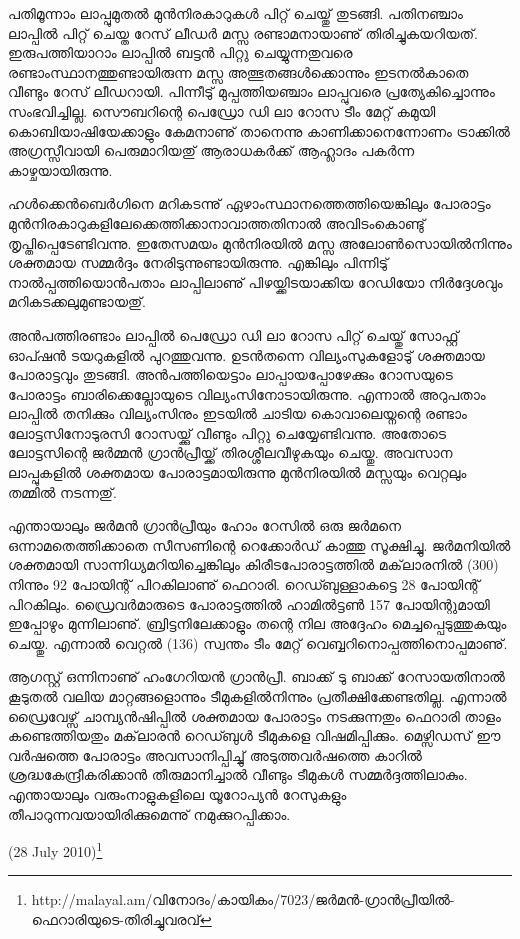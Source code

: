 പതിമൂന്നാം ലാപ്പുമുതല്‍ മുന്‍നിരകാറുകള്‍ പിറ്റ് ചെയ്തു് തുടങ്ങി. പതിനഞ്ചാം ലാപ്പില്‍ പിറ്റ് ചെയ്ത റേസ് ലീഡര്‍ മസ്സ 
രണ്ടാമനായാണു് തിരിച്ചുകയറിയത്. ഇരുപത്തിയാറാം ലാപ്പില്‍ ബട്ടന്‍ പിറ്റു ചെയ്യുന്നതുവരെ രണ്ടാംസ്ഥാനത്തുണ്ടായിരുന്ന 
മസ്സ അത്ഭുതങ്ങള്‍ക്കൊന്നും ഇടനല്‍കാതെ വീണ്ടും റേസ് ലീഡറായി. പിന്നീടു് മുപ്പത്തിയഞ്ചാം 
ലാപ്പുവരെ പ്രത്യേകിച്ചൊന്നും സംഭവിച്ചില്ല. സൌബറിന്റെ പെഡ്രോ ഡി ലാ റോസ ടീം മേറ്റ് കമുയി 
കൊബിയാഷിയേക്കാളും കേമനാണു് താനെന്നു കാണിക്കാനെന്നോണം ട്രാക്കില്‍ അഗ്രസ്സീവായി പെരുമാറിയതു് 
ആരാധകര്‍ക്ക് ആഹ്ലാദം പകര്‍ന്ന കാഴ്ചയായിരുന്നു.

ഹള്‍ക്കെന്‍ബെര്‍ഗിനെ മറികടന്നു് ഏഴാംസ്ഥാനത്തെത്തിയെങ്കിലും പോരാട്ടം 
മുന്‍നിരകാറുകളിലേക്കെത്തിക്കാനാവാത്തതിനാല്‍ അവിടംകൊണ്ടു് തൃപ്തിപ്പെടേണ്ടിവന്നു. ഇതേസമയം മുന്‍നിരയില്‍ 
മസ്സ അലോണ്‍സൊയില്‍നിന്നും ശക്തമായ സമ്മര്‍ദ്ദം നേരിടുന്നുണ്ടായിരുന്നു. എങ്കിലും പിന്നിടു് നാല്‍പ്പത്തിയൊന്‍പതാം 
ലാപ്പിലാണു് പിഴയ്ക്കിടയാക്കിയ റേഡിയോ നിര്‍ദ്ദേശവും മറികടക്കലുമുണ്ടായതു്.

അന്‍പത്തിരണ്ടാം ലാപ്പില്‍ പെഡ്രോ ഡി ലാ റോസ പിറ്റ് ചെയ്തു് സോഫ്റ്റ് ഓപ്ഷന്‍ ടയറുകളില്‍ പുറത്തുവന്നു. ഉടന്‍തന്നെ 
വില്യംസുകളോടു് ശക്തമായ പോരാട്ടവും തുടങ്ങി. അന്‍പത്തിയെട്ടാം ലാപ്പായപ്പോഴേക്കും റോസയുടെ പോരാട്ടം 
ബാരിക്കെല്ലോയുടെ വില്യംസിനോടായിരുന്നു. എന്നാല്‍ അറുപതാം ലാപ്പില്‍ തനിക്കും വില്യംസിനും ഇടയില്‍ ചാടിയ 
കൊവാലെയ്നന്റെ രണ്ടാം ലോട്ടസിനോടുരസി റോസയ്ക്കു് വീണ്ടും പിറ്റു ചെയ്യേണ്ടിവന്നു. അതോടെ ലോട്ടസിന്റെ ജര്‍മ്മന്‍ 
ഗ്രാന്‍പ്രീയ്ക്ക് തിരശ്ശീലവീഴുകയും ചെയ്തു. അവസാന ലാപ്പുകളില്‍ ശക്തമായ പോരാട്ടമായിരുന്നു മുന്‍നിരയില്‍ മസ്സയും 
വെറ്റലും തമ്മില്‍ നടന്നതു്.

എന്തായാലും ജര്‍മന്‍ ഗ്രാന്‍പ്രീയും ഹോം റേസില്‍ ഒരു ജര്‍മനെ ഒന്നാമതെത്തിക്കാതെ സീസണിന്റെ റെക്കോര്‍ഡ് കാത്തു 
സൂക്ഷിച്ചു. ജര്‍മനിയില്‍ ശക്തമായി സാന്നിധ്യമറിയിച്ചെങ്കിലും കിരീടപോരാട്ടത്തില്‍ മക്‌ലാരനില്‍ (300) നിന്നും 92 
പോയിന്റ് പിറകിലാണു് ഫെറാരി. റെഡ്ബുള്ളാകട്ടെ 28 പോയിന്റ് പിറകിലും. ഡ്രൈവര്‍മാരുടെ പോരാട്ടത്തില്‍ 
ഹാമില്‍ട്ടണ്‍ 157 പോയിന്റുമായി ഇപ്പോഴും മുന്നിലാണു്. ബ്രിട്ടനിലേക്കാളും തന്റെ നില അദ്ദേഹം മെച്ചപ്പെടുത്തുകയും 
ചെയ്തു. എന്നാല്‍ വെറ്റല്‍ (136) സ്വന്തം ടീം മേറ്റ് വെബ്ബറിനൊപ്പത്തിനൊപ്പമാണു്.

ആഗസ്റ്റ് ഒന്നിനാണു് ഹംഗേറിയന്‍ ഗ്രാന്‍പ്രീ. ബാക്ക് ടു ബാക്ക് റേസായതിനാല്‍ കൂടുതല്‍ വലിയ മാറ്റങ്ങളൊന്നും 
ടീമുകളില്‍നിന്നും പ്രതീക്ഷിക്കേണ്ടതില്ല. എന്നാല്‍ ഡ്രൈവേഴ്സ് ചാമ്പ്യന്‍ഷിപ്പില്‍ ശക്തമായ പോരാട്ടം നടക്കുന്നതും ഫെറാരി 
താളം കണ്ടെത്തിയതും മക്‌ലാരന്‍ റെഡ്ബുള്‍ ടീമുകളെ വിഷമിപ്പിക്കും. മെഴ്സിഡസ് ഈ വര്‍ഷത്തെ പോരാട്ടം 
അവസാനിപ്പിച്ചു് അടുത്തവര്‍ഷത്തെ കാറില്‍ ശ്രദ്ധകേന്ദ്രീകരിക്കാന്‍ തീരുമാനിച്ചാല്‍ വീണ്ടും ടീമുകള്‍ സമ്മര്‍ദ്ദത്തിലാകും.
എന്തായാലും വരുംനാളുകളിലെ യൂറോപ്യന്‍ റേസുകളും തീപാറുന്നവയായിരിക്കുമെന്നു് നമുക്കുറപ്പിക്കാം.

(28 July 2010)\footnote{http://malayal.am/വിനോദം/കായികം/7023/ജര്‍മന്‍-ഗ്രാന്‍പ്രീയില്‍-ഫെറാരിയുടെ-തിരിച്ചുവരവ്}

\newpage
